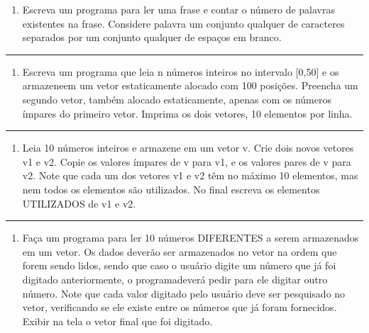 \documentclass[12pt,a4paper]{article}
\renewcommand{\linethickness}{0.05em}
\providecommand{\tightlist}{%
      \setlength{\itemsep}{0pt}\setlength{\parskip}{0pt}}
\begin{document}
\begin{enumerate}
\def\labelenumi{\arabic{enumi}.}
\setcounter{enumi}{24}
\tightlist
\item
  Escreva um programa para ler uma frase e contar o número de palavras
  existentes na frase. Considere palavra um conjunto qualquer de
  caracteres separados por um conjunto qualquer de espaços em branco.
\end{enumerate}

    \begin{center}\rule{0.5\linewidth}{\linethickness}\end{center}

\begin{enumerate}
\def\labelenumi{\arabic{enumi}.}
\setcounter{enumi}{25}
\tightlist
\item
  Escreva um programa que leia n números inteiros no intervalo
  {[}0,50{]} e os armazeneem um vetor estaticamente alocado com 100
  posições. Preencha um segundo vetor, também alocado estaticamente,
  apenas com os números ímpares do primeiro vetor. Imprima os dois
  vetores, 10 elementos por linha.
\end{enumerate}

    \begin{center}\rule{0.5\linewidth}{\linethickness}\end{center}

\begin{enumerate}
\def\labelenumi{\arabic{enumi}.}
\setcounter{enumi}{26}
\tightlist
\item
  Leia 10 números inteiros e armazene em um vetor v. Crie dois novos
  vetores v1 e v2. Copie os valores ímpares de v para v1, e os valores
  pares de v para v2. Note que cada um dos vetores v1 e v2 têm no máximo
  10 elementos, mas nem todos os elementos são utilizados. No final
  escreva os elementos UTILIZADOS de v1 e v2.
\end{enumerate}

    \begin{center}\rule{0.5\linewidth}{\linethickness}\end{center}

\begin{enumerate}
\def\labelenumi{\arabic{enumi}.}
\setcounter{enumi}{27}
\tightlist
\item
  Faça um programa para ler 10 números DIFERENTES a serem armazenados em
  um vetor. Os dados deverão ser armazenados no vetor na ordem que forem
  sendo lidos, sendo que caso o usuário digite um número que já foi
  digitado anteriormente, o programadeverá pedir para ele digitar outro
  número. Note que cada valor digitado pelo usuário deve ser pesquisado
  no vetor, verificando se ele existe entre os números que já foram
  fornecidos. Exibir na tela o vetor final que foi digitado.
\end{enumerate}
\end{document}
